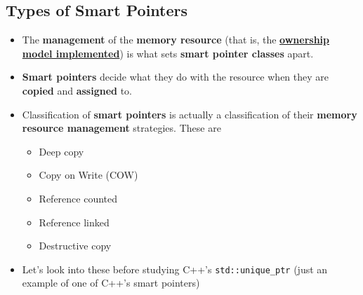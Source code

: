 \documentclass[10pt]{article}
\begin{document}
\newpage

\subsection{Types of Smart Pointers}
\begin{itemize}
	\item The \textbf{management} of the \textbf{memory resource} (that is, the \textbf{\underline{ownership model implemented}}) is what sets \textbf{smart pointer classes} apart.

	\item \textbf{Smart pointers} decide what they do with the resource when they are \textbf{copied} and \textbf{assigned} to.

	\item Classification of \textbf{smart pointers} is actually a classification of their \textbf{memory resource management} strategies. These are
		\begin{itemize}
		\item Deep copy
		\item Copy on Write (COW)
		\item Reference counted
		\item Reference linked
		\item Destructive copy
		\end{itemize}

	\item Let's look into these before studying C++'s \verb|std::unique_ptr| (just an example of one of C++'s smart pointers)
\end{itemize}

\newpage
\end{document}

